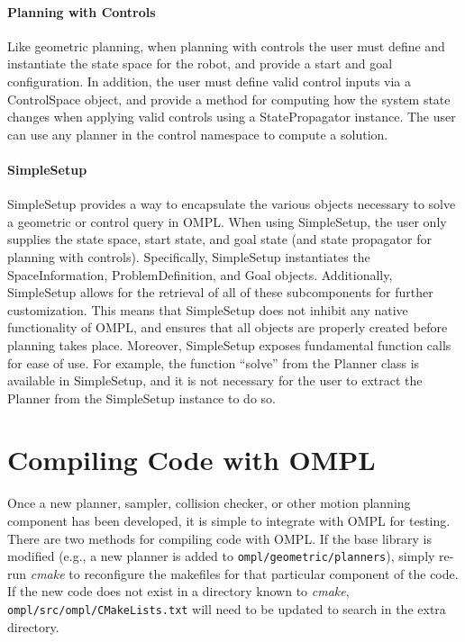 \paragraph {Planning with Controls}
Like geometric planning, when planning with controls the user must define and
instantiate the state space for the robot, and provide a start and goal
configuration.  In addition, the user must define valid control inputs via
a ControlSpace object, and provide a method for computing how the system state
changes when applying valid controls using a StatePropagator instance.  The
user can use any planner in the control namespace to compute a solution.

\paragraph {SimpleSetup}
SimpleSetup provides a way to encapsulate the various objects necessary to
solve a geometric or control query in OMPL.  When using SimpleSetup, the user
only supplies the state space, start state, and goal state (and state propagator
for planning with controls). Specifically, SimpleSetup instantiates the
SpaceInformation, ProblemDefinition, and Goal objects.  Additionally,
SimpleSetup allows for the retrieval of all of these subcomponents for further
customization.  This means that SimpleSetup does not inhibit any native
functionality of OMPL, and ensures that all objects are properly created before
planning takes place.  Moreover, SimpleSetup exposes fundamental function
calls for ease of use.  For example, the function ``solve'' from the Planner
class is available in SimpleSetup, and it is not necessary for the user to
extract the Planner from the SimpleSetup instance to do so.

\section {Compiling Code with OMPL}
Once a new planner, sampler, collision checker, or other motion planning
component has been developed, it is simple to integrate with OMPL for testing.
There are two methods for compiling code with OMPL.  If the base library is
modified (e.g., a new planner is added to  {\tt ompl/geometric/planners}),
simply re-run \emph{cmake} to reconfigure the makefiles for that particular
component of the code.  If the new code does not exist in a directory known to
\emph{cmake}, {\tt ompl/src/ompl/CMakeLists.txt} will need to be updated to
search in the extra directory.

